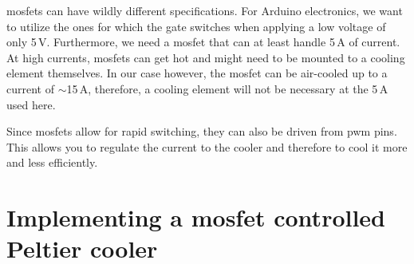 \Acp{mosfet} can have wildly different specifications. For Arduino electronics, we want to utilize the ones for which the gate switches when applying a low voltage of only 5\,V. Furthermore, we need a \ac{mosfet} that can at least handle 5\,A of current. At high currents, \acp{mosfet} can get hot and might need to be mounted to a cooling element themselves. In our case however, the \ac{mosfet} can be air-cooled up to a current of $\sim$15\,A, therefore, a cooling element will not be necessary at the 5\,A used here.

Since \acp{mosfet} allow for rapid switching, they can also be driven from \ac{pwm} pins. This allows you to regulate the current to the cooler and therefore to cool it more and less efficiently.



\section{Implementing a \ac{mosfet} controlled Peltier cooler}

